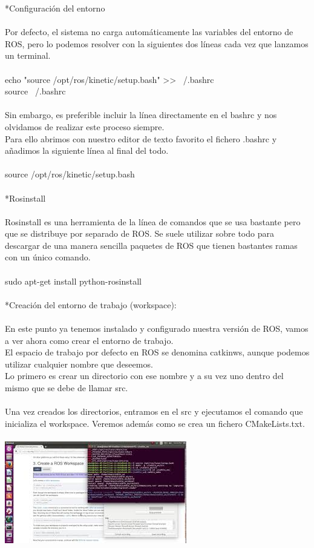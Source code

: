 \documentclass[12pt,a4paper]{article}
\begin{document}
*Configuración del entorno
\\\\
Por defecto, el sistema no carga automáticamente las variables del entorno de ROS, pero lo podemos resolver con la siguientes dos líneas cada vez que lanzamos un terminal.
\\\\
echo "source /opt/ros/kinetic/setup.bash" >> ~/.bashrc \\
source ~/.bashrc
\\\\
Sin embargo, es preferible incluir la línea directamente en el bashrc y nos olvidamos de realizar este proceso siempre. \\
Para ello abrimos con nuestro editor de texto favorito el fichero .bashrc y añadimos la siguiente línea al final del todo.
\\\\
source /opt/ros/kinetic/setup.bash
\\\\
*Rosinstall
\\\\
Rosinstall es una herramienta de la línea de comandos que se usa bastante pero que se distribuye por separado de ROS.  Se suele utilizar sobre todo para descargar de una manera sencilla paquetes de ROS que tienen bastantes ramas con un único comando.
\\\\
sudo apt-get install python-rosinstall
\\\\
*Creación del entorno de trabajo (workspace):
\\\\
En este punto ya tenemos instalado y configurado nuestra versión de ROS, vamos a ver ahora como crear el entorno de trabajo. \\
El espacio de trabajo por defecto en ROS se denomina catkinws, aunque podemos utilizar cualquier nombre que deseemos. \\
Lo primero es crear un directorio con ese nombre y a su vez uno dentro del mismo que se debe de llamar src. 
\\\\
Una vez creados los directorios, entramos en el src y ejecutamos el comando que inicializa el workspace. Veremos además como se crea un fichero  CMakeLists.txt. 
\\\\
\newpage 
\includegraphics[scale=1.6]{images.jpg} 
\end{document}
